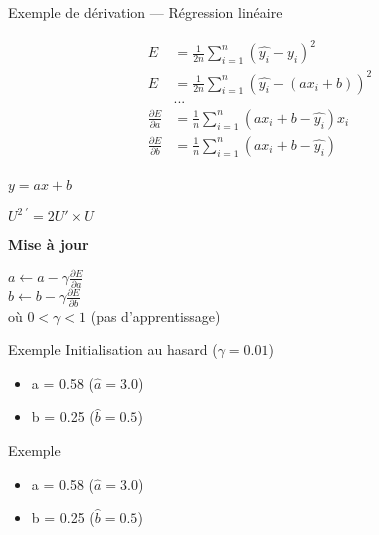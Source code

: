 \begin{frame}{Exemple de dérivation --- Régression linéaire}
  \begin{minipage}[l]{0.49\linewidth}
    \begin{align*}
      E & = \frac{1}{2n} \sum_{i=1}^n( \hat{y_i} - y_i )^2 \\
      E & = \frac{1}{2n}\sum_{i=1}^n( \hat{y_i} - (ax_i + b) )^2 \\
      & ... \\
      \frac{\partial E}{\partial a} & = \frac{1}{n}\sum^n_{i=1}(ax_i + b - \hat{y_i})x_i \\
      \frac{\partial E}{\partial b} & = \frac{1}{n}\sum^n_{i=1}(ax_i + b - \hat{y_i}) \\
    \end{align*}
  \end{minipage}\hfill
  \begin{minipage}[c]{0.49\linewidth}
    \begin{center}
      $\boxed{y = ax+b}$
    \end{center}

    \begin{center}
      $\boxed{U^{2\;\prime}=2U' \times U}$
    \end{center}
    \vfill
    \begin{center}
      \textbf{Mise à jour}

      $a \leftarrow a - \gamma\frac{\partial{E}}{\partial{a}}$ \\
      $b \leftarrow b - \gamma\frac{\partial{E}}{\partial{b}}$ \\
      $\;$ \\
      où $0 < \gamma < 1$ (pas d'apprentissage)
    \end{center}
  \end{minipage}\hfill
\end{frame}

\begin{frame}{Exemple}
  Initialisation au hasard ($\gamma = 0.01$)
  \begin{itemize}
    \item a = 0.58 ($\hat{a} = 3.0$)
    \item b = 0.25 ($\hat{b} = 0.5$)
  \end{itemize}
\end{frame}

\begin{frame}{Exemple}
  \begin{itemize}
    \item a = 0.58 ($\hat{a} = 3.0$)
    \item b = 0.25 ($\hat{b} = 0.5$)
  \end{itemize}
\end{frame}

